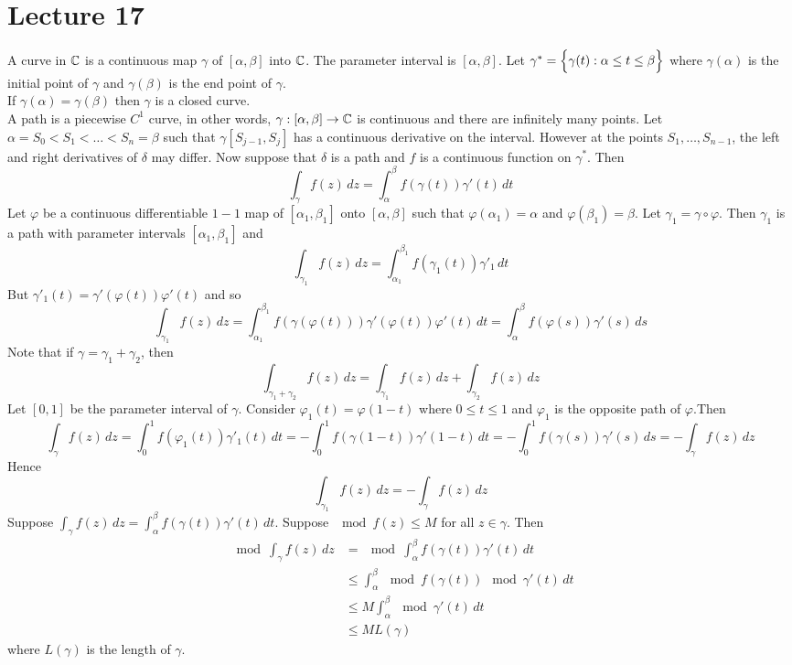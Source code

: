 \documentclass[12pt]{article}
\begin{document}
\section{Lecture 17} 
A curve in $\mathbb{C}$ is a continuous map $\gamma$ of $[\alpha, \beta]$ into $\mathbb{C}$. The parameter interval is $[\alpha,\beta]$. Let $\gamma^* = \Big\{ \gamma(t) : \alpha \leq t \leq \beta \Big\}$ where $\gamma(\alpha)$ is the initial point of $\gamma$ and $\gamma(\beta)$ is the end point of $\gamma$. \\
If $\gamma(\alpha) = \gamma(\beta)$ then $\gamma$ is a closed curve. \\
A path is a piecewise $C^1$ curve, in other words, $\gamma: [\alpha,\beta] \to \mathbb{C}$ is continuous and there are infinitely many points. Let $\alpha = S_0 < S_1 < \dots < S_n = \beta$ such that $\gamma[S_{j-1}, S_j]$ has a continuous derivative on the interval. However at the points $S_1,\dots,S_{n-1}$, the left and right derivatives of $\delta$ may differ. Now suppose that $\delta$ is a path and $f$ is a continuous function on $\gamma^*$. Then $$\int_\gamma f(z) \, dz = \int_\alpha^\beta f(\gamma(t))\gamma'(t) \, dt $$ Let $\varphi$ be a continuous differentiable $1-1$ map of $[\alpha_1,\beta_1]$ onto $[\alpha,\beta]$ such that $\varphi(\alpha_1) = \alpha$ and $\varphi(\beta_1) = \beta$. Let $\gamma_1 = \gamma \circ \varphi$. Then $\gamma_1$ is a path with parameter intervals $[\alpha_1,\beta_1]$ and $$\int_{\gamma_1} f(z)\,dz = \int_{\alpha_1}^{\beta_1} f(\gamma_1(t))\gamma'_1 \, dt $$ But $\gamma'_1(t) = \gamma'(\varphi(t))\varphi'(t)$ and so $$\int_{\gamma_1} f(z) \, dz = \int_{\alpha_1}^{\beta_1} f(\gamma(\varphi(t))) \gamma'(\varphi(t)) \varphi'(t) \, dt = \int_\alpha^\beta f(\varphi(s))\gamma'(s) \,ds $$ 
Note that if $\gamma = \gamma_1 + \gamma_2$, then $$ \int_{\gamma_1 + \gamma_2} f(z) \, dz = \int_{\gamma_1} f(z)\,dz + \int_{\gamma_2} f(z) \,dz $$ 
Let $[0,1]$ be the parameter interval of $\gamma$. Consider $\varphi_1(t) = \varphi(1-t)$ where $0 \leq t \leq1$ and $\varphi_1$ is the opposite path of $\varphi$.Then $$ \int_\gamma f(z) \, dz = \int_0^1 f(\varphi_1(t))\gamma'_1(t)\, dt = -\int_0^1 f(\gamma(1-t))\gamma'(1-t) \, dt = -\int_0^1 f(\gamma(s))\gamma'(s) \,ds = -\int_\gamma f(z) \, dz $$ 
Hence $$\int_{\gamma_1} f(z) \,dz = -\int_\gamma f(z) \, dz $$ 
Suppose $\int_{\gamma} f(z) \, dz = \int_\alpha^\beta f(\gamma(t))\gamma'(t)\, dt$. Suppose $\mod{f(z)} \leq M$ for all $z \in \gamma$. Then $$ \begin{aligned} \mod{\int_\gamma f(z) \, dz} &= \mod{\int_\alpha^\beta f(\gamma(t))\gamma'(t) \, dt} \\ &\leq \int_\alpha^\beta \mod{f(\gamma(t))} \mod{\gamma'(t)} \, dt \\ &\leq M\int_\alpha^\beta \mod{\gamma'(t)}\, dt \\ &\leq ML(\gamma) \end{aligned} $$ where $L(\gamma)$ is the length of $\gamma$. \\~\\
\end{document}
